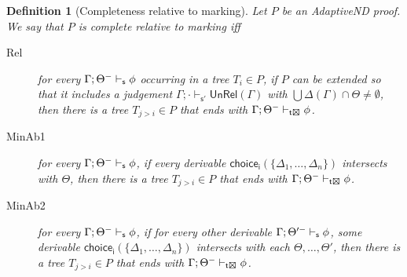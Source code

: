\documentclass[]{article}
\newtheorem{definition}{Definition}
\newcommand{\Unrel}{\ensuremath{\mathsf{UnRel}}}
\begin{document}
\begin{definition}[Completeness relative to marking]
Let $P$ be an {\sf AdaptiveND} proof. We say that $P$ is complete relative to marking
iff
\begin{description}
    \item[Rel] for every $\Gamma; \Theta^{-}\vdash_{{\sf s}} \phi$ occurring in a tree $T_{i}\in P$, if $P$ can be extended so that it includes a judgement $\Gamma;\cdot \vdash_{\mathsf{s'}} \Unrel(\Gamma)$ with $\bigcup \Delta(\Gamma) \cap \Theta \neq \emptyset$, then there is a tree $T_{j>i}\in P$ that ends with $\Gamma; \Theta^{-}\vdash_{{\sf t\XBox}} \phi$.
    \item[MinAb1] for every $\Gamma; \Theta^{-}\vdash_{{\sf s}} \phi$, if every derivable $\mathsf{choice_i}(\{\Delta_1, \ldots, \Delta_n\})$ intersects with $\Theta$, then there is a tree $T_{j>i}\in P$ that ends with  $\Gamma; \Theta^{-}\vdash_{{\sf t\XBox}} \phi$.
    \item[MinAb2] for every $\Gamma; \Theta^{-}\vdash_{{\sf s}} \phi$, if for every other derivable $\Gamma; \Theta'^{-}\vdash_{{\sf s}} \phi$, some derivable
     $\mathsf{choice_i}(\{\Delta_1, \ldots, \Delta_n\})$ intersects with each $\Theta, \dots, \Theta'$, then there is a tree $T_{j>i}\in P$ that ends with $\Gamma; \Theta^{-}\vdash_{{\sf t\XBox}} \phi$.

\end{description}



\end{definition}

\end{document}
